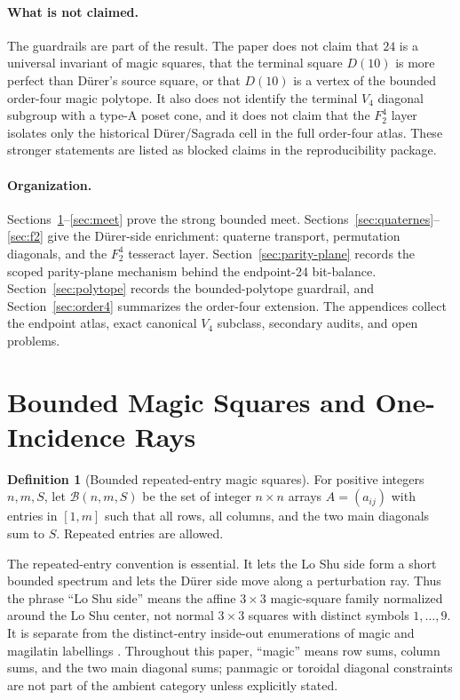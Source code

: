 \documentclass[11pt,a4paper]{article}
\theoremstyle{definition}
\newtheorem{definition}[theorem]{Definition}
\theoremstyle{remark}
\newcommand{\B}{\mathcal B}
\newcommand{\Durer}{D\"urer\xspace}
\begin{document}
\paragraph{What is not claimed.}
The guardrails are part of the result.  The paper does not claim that \(24\)
is a universal invariant of magic squares, that the terminal square \(D(10)\)
is more perfect than \Durer's source square, or that \(D(10)\) is a vertex of
the bounded order-four magic polytope.  It also does not identify the
terminal \(V_4\) diagonal subgroup with a type-A poset cone, and it does not
claim that the \(F_2^4\) layer isolates only the historical \Durer/Sagrada cell
in the full order-four atlas.  These stronger statements are listed as
blocked claims in the reproducibility package.

\paragraph{Organization.}
Sections~\ref{sec:bounded}--\ref{sec:meet} prove the strong bounded meet.
Sections~\ref{sec:quaternes}--\ref{sec:f2} give the \Durer-side enrichment:
quaterne transport, permutation diagonals, and the \(F_2^4\) tesseract layer.
Section~\ref{sec:parity-plane} records the scoped parity-plane mechanism
behind the endpoint-24 bit-balance.  Section~\ref{sec:polytope} records the
bounded-polytope guardrail, and
Section~\ref{sec:order4} summarizes the order-four extension.  The appendices
collect the endpoint atlas, exact canonical \(V_4\) subclass, secondary
audits, and open problems.

\section{Bounded Magic Squares and One-Incidence Rays}
\label{sec:bounded}

\begin{definition}[Bounded repeated-entry magic squares]
For positive integers \(n,m,S\), let \(\B(n,m,S)\) be the set of integer
\(n\times n\) arrays \(A=(a_{ij})\) with entries in \([1,m]\) such that all
rows, all columns, and the two main diagonals sum to \(S\).  Repeated entries
are allowed.
\end{definition}

The repeated-entry convention is essential.  It lets the Lo Shu side form a
short bounded spectrum and lets the \Durer side move along a perturbation ray.
Thus the phrase ``Lo Shu side'' means the affine \(3\times3\) magic-square
family normalized around the Lo Shu center, not normal \(3\times3\) squares
with distinct symbols \(1,\ldots,9\).  It is separate from the distinct-entry
inside-out enumerations of magic and magilatin labellings
\cite{beckZaslavskyInsideOut,beckZaslavskyMagicLabellings,beckVanHerick}.
Throughout this paper, ``magic'' means row sums, column sums, and the two main
diagonal sums; panmagic or toroidal diagonal constraints are not part of the
ambient category unless explicitly stated.
\end{document}
